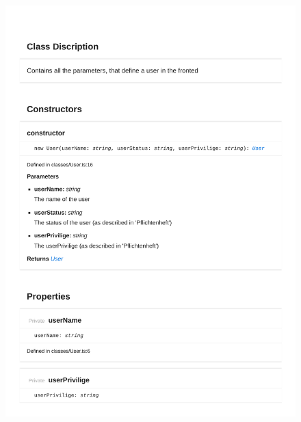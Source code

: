 \begin{figure}[H]
\centerline{\includegraphics[width=\textwidth]{FrontendDocsAsPDF/Classes/User.pdf}}
\end{figure}

